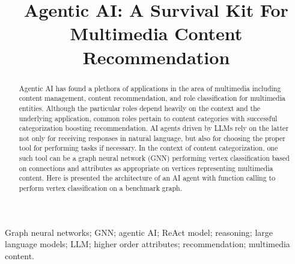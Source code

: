 \documentclass[conference, compsoc, final]{IEEEtran}
\begin{document}
\title{Agentic AI: A Survival Kit For Multimedia Content Recommendation}%
\author{%
\and
\and
\and
}%

\maketitle


\begin{abstract}
Agentic AI has found a plethora of applications in the area of multimedia including content management, content recommendation, and role classification for multimedia entities. Although the particular roles depend heavily on the context and the underlying application, common roles pertain to content categories with successful categorization boosting recommendation. AI agents driven by LLMs rely on the latter not only for receiving responses in natural language, but also for choosing the proper tool for performing tasks if necessary. In the context of content categorization, one such tool can be a graph neural network (GNN) performing vertex classification based on connections and attributes as appropriate on vertices representing multimedia content. Here is presented the architecture of an AI agent with function calling to perform vertex classification on a benchmark graph.
\end{abstract}

\begin{IEEEkeywords}
Graph neural networks; GNN; agentic AI; ReAct model; reasoning; large language models; LLM; higher order attributes; recommendation; multimedia content. 
\end{IEEEkeywords}
\end{document}
